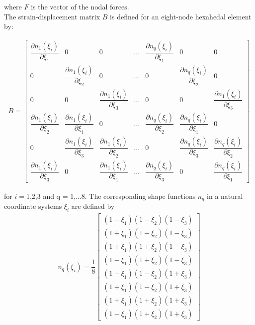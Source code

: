where \textbf{$F$} is the vector of the nodal forces.\\

The strain-displacement matrix \textbf{$B$} is defined for an eight-node hexahedal element by:

\begingroup
\renewcommand*{\arraystretch}{1.6}
\begin{align}
B =\begin{bmatrix}
\dfrac{\partial n_1(\xi_i)}{\partial\xi_1} & 0 & 0 & ... & \dfrac{\partial n_q(\xi_i)}{\partial\xi_1} & 0 & 0 \\ 
0 & \dfrac{\partial n_1(\xi_i)}{\partial\xi_2} & 0 & ... & 0 & \dfrac{\partial n_q(\xi_i)}{\partial\xi_2} & 0 \\ 
0 & 0 & \dfrac{\partial n_1(\xi_i)}{\partial\xi_3} & ... & 0 & 0 & \dfrac{\partial n_1(\xi_i)}{\partial\xi_3} \\ 
\dfrac{\partial n_1(\xi_i)}{\partial\xi_2} & \dfrac{\partial n_1(\xi_i)}{\partial\xi_1} & 0 & ... & \dfrac{\partial n_q(\xi_i)}{\partial\xi_2} & \dfrac{\partial n_q(\xi_i)}{\partial\xi_1} & 0 \\ 
0 & \dfrac{\partial n_1(\xi_i)}{\partial\xi_3} & \dfrac{\partial n_1(\xi_i)}{\partial\xi_2} & ... & 0 & \dfrac{\partial n_q(\xi_i)}{\partial\xi_3} & \dfrac{\partial n_q(\xi_i)}{\partial\xi_2} \\ 
\dfrac{\partial n_1(\xi_i)}{\partial\xi_3} & 0 & \dfrac{\partial n_1(\xi_i)}{\partial\xi_1} & ... & \dfrac{\partial n_q(\xi_i)}{\partial\xi_3} & 0 & \dfrac{\partial n_q(\xi_i)}{\partial\xi_1} 
\end{bmatrix} 
\label{equ_strain_displace_B_matrix}
\end{align}
\endgroup

for \textbf{$i = $}1,2,3 and q = 1,...8. The corresponding shape functions \textbf{$n_q$} in a natural coordinate systems $\xi_i$ are defined by
\begin{align*}
n_q(\xi_i) = \dfrac{1}{8}
\begin{bmatrix}
(1-\xi_1)(1-\xi_2)(1-\xi_3) \\ 
(1+\xi_1)(1-\xi_2)(1-\xi_3) \\ 
(1+\xi_1)(1+\xi_2)(1-\xi_3) \\ 
(1-\xi_1)(1+\xi_2)(1-\xi_3) \\ 
(1-\xi_1)(1-\xi_2)(1+\xi_3) \\ 
(1+\xi_1)(1-\xi_2)(1+\xi_3) \\ 
(1+\xi_1)(1+\xi_2)(1+\xi_3) \\ 
(1-\xi_1)(1+\xi_2)(1+\xi_3)
\end{bmatrix} 
\end{align*}

